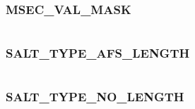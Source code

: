 \documentclass[letterpaper,10pt,english]{sphinxmanual}
\begin{document}
\subsubsection{MSEC\_VAL\_MASK}
\label{appdev/refs/macros/MSEC_VAL_MASK:msec-val-mask-data}\label{appdev/refs/macros/MSEC_VAL_MASK::doc}\label{appdev/refs/macros/MSEC_VAL_MASK:msec-val-mask}

\begin{fulllineitems}
\label{appdev/refs/macros/MSEC_VAL_MASK:MSEC_VAL_MASK}
\end{fulllineitems}


\begin{tabulary}{\linewidth}{|L|L|}
\hline

 & 
\\\hline
\end{tabulary}



\subsubsection{SALT\_TYPE\_AFS\_LENGTH}
\label{appdev/refs/macros/SALT_TYPE_AFS_LENGTH::doc}\label{appdev/refs/macros/SALT_TYPE_AFS_LENGTH:salt-type-afs-length-data}\label{appdev/refs/macros/SALT_TYPE_AFS_LENGTH:salt-type-afs-length}

\begin{fulllineitems}
\label{appdev/refs/macros/SALT_TYPE_AFS_LENGTH:SALT_TYPE_AFS_LENGTH}
\end{fulllineitems}


\begin{tabulary}{\linewidth}{|L|L|}
\hline

 & 
\\\hline
\end{tabulary}



\subsubsection{SALT\_TYPE\_NO\_LENGTH}
\label{appdev/refs/macros/SALT_TYPE_NO_LENGTH:salt-type-no-length-data}\label{appdev/refs/macros/SALT_TYPE_NO_LENGTH::doc}\label{appdev/refs/macros/SALT_TYPE_NO_LENGTH:salt-type-no-length}
\end{document}
